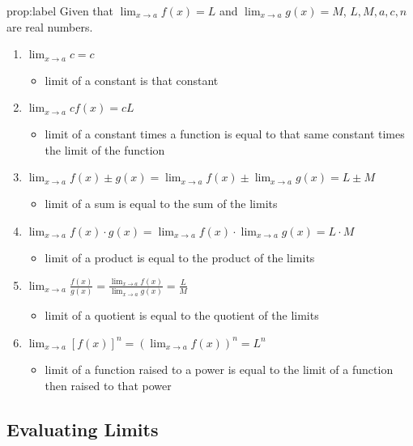 \documentclass{package/notes}
\begin{document}
\begin{proposition}{prop:label}
	Given that $\lim_{x\to a}f(x) = L$ and $\lim_{x\to a} g(x) = M$, $L,M,a,c,n$ are real numbers.
	\begin{enumerate}
		\item $\lim_{x\to a} c = c$
		\begin{itemize}
			\item limit of a constant is that constant
		\end{itemize}
		\item $\lim_{x\to a} cf(x) = cL$
		\begin{itemize}
			\item limit of a constant times a function is equal to that same constant times the limit of the function
		\end{itemize}
		\item $\lim_{x\to a} f(x) \pm g(x) = \lim_{x \to a} f(x) \pm \lim_{x\to a} g(x) = L \pm M$
		\begin{itemize}
			\item limit of a sum is equal to the sum of the limits
		\end{itemize}
		\item $\lim_{x\to a} f(x) \cdot g(x) = \lim_{x \to a} f(x) \cdot \lim_{x\to a} g(x) = L \cdot M$
		\begin{itemize}
			\item limit of a product is equal to the product of the limits
		\end{itemize}
		\item $\lim_{x\to a} \frac{f(x)}{g(x)} = \frac{\lim_{x \to a} f(x)}{\lim_{x\to a} g(x)} = \frac{L}{M}$
		\begin{itemize}
			\item limit of a quotient is equal to the quotient of the limits
		\end{itemize}
		\item $\lim_{x \to a} \left[f(x)\right]^n = \left(\lim_{x \to a} f(x)\right)^n = L^n$
		\begin{itemize}
			\item limit of a function raised to a power is equal to the limit of a function then raised to that power
		\end{itemize}
	\end{enumerate}
\end{proposition}


\subsection{Evaluating Limits}
\end{document}
